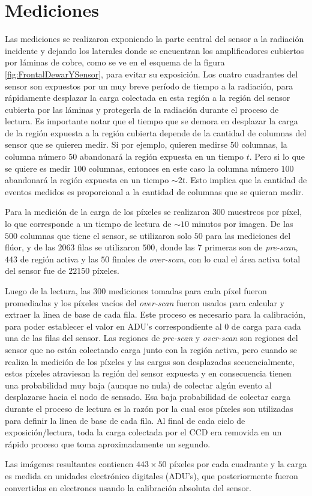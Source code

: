 \section{Mediciones}
\noindent Las mediciones se realizaron exponiendo la parte central del sensor a la radiación incidente y dejando los laterales donde se encuentran los amplificadores cubiertos por láminas de cobre, como se ve en el esquema de la figura \ref{fig:FrontalDewarYSensor}, para evitar su exposición. Los cuatro cuadrantes del sensor son expuestos por un muy breve período de tiempo a la radiación, para rápidamente desplazar la carga colectada en esta región a la región del sensor cubierta por las láminas y protegerla de la radiación durante el proceso de lectura. Es importante notar que el tiempo que se demora en desplazar la carga de la región expuesta a la región cubierta depende de la cantidad de columnas del sensor que se quieren medir. Si por ejemplo, quieren medirse $50$ columnas, la columna número $50$ abandonará la región expuesta en un tiempo $t$. Pero si lo que se quiere es medir $100$ columnas, entonces en este caso la columna número $100$ abandonará la región expuesta en un tiempo $\sim 2t$. Esto implica que la cantidad de eventos medidos es proporcional a la cantidad de columnas que se quieran medir.

Para la medición de la carga de los píxeles se realizaron $300$ muestreos por píxel, lo que corresponde a un tiempo de lectura de $\sim 10$ minutos por imagen. De las $500$ columnas que tiene el sensor, se utilizaron solo $50$ para las mediciones del flúor, y de las $2063$ filas se utilizaron $500$, donde las $7$ primeras son de \textit{pre-scan}, $443$ de región activa y las $50$ finales de \textit{over-scan}, con lo cual el área activa total del sensor fue de $22150$ píxeles.

Luego de la lectura, las $300$ mediciones tomadas para cada píxel fueron promediadas y los píxeles vacíos del \textit{over-scan} fueron usados para calcular y extraer la linea de base de cada fila. Este proceso es necesario para la calibración, para poder establecer el valor en ADU's correspondiente al $0$ de carga para cada una de las filas del sensor. Las regiones de \textit{pre-scan} y \textit{over-scan} son regiones del sensor que no están colectando carga junto con la región activa, pero cuando se realiza la medición de los píxeles y las cargas son desplazadas secuencialmente, estos píxeles atraviesan la región del sensor expuesta y en consecuencia tienen una probabilidad muy baja (aunque no nula) de colectar algún evento al desplazarse hacia el nodo de sensado. Esa baja probabilidad de colectar carga durante el proceso de lectura es la razón por la cual esos píxeles son utilizadas para definir la linea de base de cada fila. Al final de cada ciclo de exposición/lectura, toda la carga colectada por el CCD era removida en un rápido proceso que toma aproximadamente un segundo.

Las imágenes resultantes contienen $443 \times 50$ píxeles por cada cuadrante y la carga es medida en unidades electrónico digitales (ADU's), que posteriormente fueron convertidas en electrones usando la calibración absoluta del sensor.
